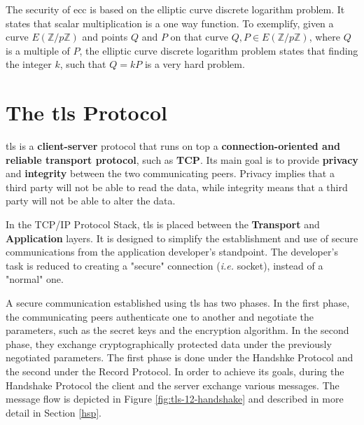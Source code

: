 \documentclass{llncs}
\begin{document}
The security of \gls{ecc} is based on the elliptic curve discrete logarithm
problem. It states that scalar multiplication is a one way function. To exemplify,
given a curve $E(\mathbb{Z}/p\mathbb{Z})$ and points $Q$ and $P$ on that curve
$Q,P \in E(\mathbb{Z}/p\mathbb{Z})$, where $Q$ is a multiple of $P$, the elliptic curve discrete logarithm problem
states that finding the integer $k$, such that $Q=kP$ is a very hard problem.

\section{The \gls{tls} Protocol}

\gls{tls} is a \textbf{client-server} protocol
that runs on top a \textbf{connection-oriented and reliable transport protocol},
such as \textbf{TCP}. Its main goal is to provide \textbf{privacy} and \textbf{integrity}
between the two communicating peers. Privacy implies that a third party will not
be able to read the data, while integrity means that a third party will not be
able to alter the data.

In the TCP/IP Protocol Stack, \gls{tls} is placed between the \textbf{Transport}
and \textbf{Application} layers. It is designed to simplify the establishment
and use of secure communications from the application developer's standpoint.
The developer's task is reduced to creating a "secure" connection (\textit{i.e.} socket), instead of a "normal" one.

A secure communication established using \gls{tls} has two phases. In the first
phase, the communicating peers authenticate one to another and negotiate the parameters, such as the secret keys and the encryption algorithm. In the
second phase, they exchange cryptographically protected data under
the previously negotiated parameters. The first phase is done under the
Handshke Protocol and the second under the Record Protocol. In order to
achieve its goals, during the Handshake Protocol the client and the server
exchange various messages. The message flow is depicted in Figure \ref{fig:tls-12-handshake} and described in more detail in Section
\ref{hsp}.
\end{document}
